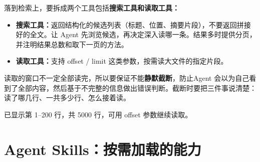 落到检索上，要拆成两个工具包括\textbf{搜索工具和读取工具：}
\begin{itemize}
  \item \textbf{搜索工具：}返回结构化的候选列表（标题、位置、摘要片段），不要返回拼接好的全文。让 Agent 先浏览候选，再决定深入读哪一条。结果多时提供分页，并注明结果总数和取下一页的方法。
  \item \textbf{读取工具：}支持 offset / limit 这类参数，按需读大文件的指定片段。
\end{itemize}
读取的窗口不一定全部读完，所以要保证不能\textbf{静默截断}，防止Agent 会以为自己看到了全部内容，然后基于不完整的信息做出错误判断。截断时要把三件事说清楚：读了哪几行、一共多少行、怎么接着读。
\begin{tcolorbox}[enhanced, sharp corners, boxrule=0pt, frame hidden,
                  borderline west={3pt}{0pt}{structurecolor},
                  colback=structurecolor!5]
已显示第 1--200 行，共 5000 行，可用 offset 参数继续读取。
\end{tcolorbox}

\section{Agent Skills：按需加载的能力}

